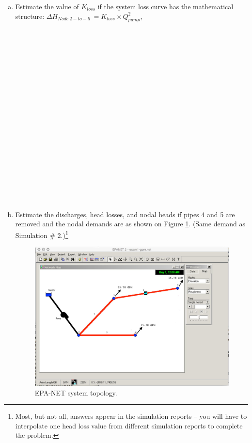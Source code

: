 \documentclass[11pt]{article}
\begin{document}
\begin{enumerate}
\begin{enumerate}[a)]
\item Estimate the value of $K_{loss}$ if the system loss curve has the mathematical structure:
 $\Delta H_{Node~2 -to- 5}~= K_{loss} \times Q_{pump}^2$, 
\\
\\
\\
\\
\\
\\
\\
\\
\\
\\
\\
\\
\\
\\
\\
\\
\\
\\
\\
\\



\item Estimate the discharges, head losses, and nodal heads if pipes 4 and 5 are removed and the nodal demands are as shown on Figure \ref{fig:epa-net-map-gpm-no5}. (Same demand as Simulation \# 2.)\footnote{Most, but not all, answers appear in the simulation reports -- you will have to interpolate one head loss value from different simulation reports to complete the problem.}
\begin{figure}[h!] %
\centering
   \includegraphics[width=6in]{epa-net-map-gpm-no5.jpg}
   \caption{EPA-NET system topology.}
   \label{fig:epa-net-map-gpm-no5} 
\end{figure}


\end{enumerate}
\end{enumerate}
\end{document}
